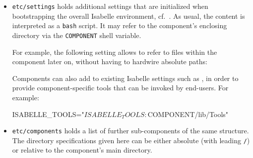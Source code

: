 \begin{isabellebody}
\begin{isamarkuptext}
  \begin{itemize}

  \item \verb|etc/settings| holds additional settings that are
  initialized when bootstrapping the overall Isabelle environment,
  cf.\ .  As usual, the content is interpreted as a
  \verb|bash| script.  It may refer to the component's enclosing
  directory via the \verb|COMPONENT| shell variable.

  For example, the following setting allows to refer to files within
  the component later on, without having to hardwire absolute paths:


  Components can also add to existing Isabelle settings such as
  \hypertarget{setting.ISABELLE-TOOLS}{\hyperlink{setting.ISABELLE-TOOLS}{\mbox{}}}, in order to provide
  component-specific tools that can be invoked by end-users.  For
  example:

  \begin{ttbox}
  ISABELLE_TOOLS="$ISABELLE_TOOLS:$COMPONENT/lib/Tools"
  \end{ttbox}

  \item \verb|etc/components| holds a list of further
  sub-components of the same structure.  The directory specifications
  given here can be either absolute (with leading \verb|/|) or
  relative to the component's main directory.

  \end{itemize}


\end{isamarkuptext}
\end{isabellebody}
